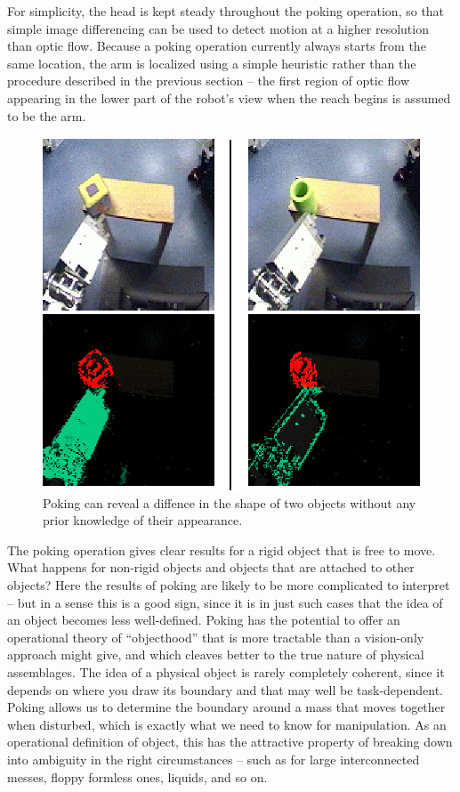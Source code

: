For simplicity, the head is kept steady throughout the poking
operation, so that simple image differencing can be used to detect
motion at a higher resolution than optic flow.  Because a poking
operation currently always starts from the same location, the arm
is localized using a simple heuristic rather than the procedure described
in the previous section -- the first region of optic flow appearing
in the lower part of the robot's view when the reach begins
is assumed to be the arm.

\ifverbose
\begin{figure}[tbh]
\begin{center}
\includegraphics[width=\columnwidth]{cube-and-cylinder.eps}
\caption{ 
\label{fig:cube-and-cylinder}
%
  Poking can reveal a diffence in the shape of two objects without
  any prior knowledge of their appearance.
%
}
\end{center}
\end{figure}
\fi

The poking operation gives clear results for a rigid object that is
free to move.  What happens for non-rigid objects and objects that are
attached to other objects?  Here the results of poking are likely to
be more complicated to interpret -- but in a sense this is a good
sign, since it is in just such cases that the idea of an object
becomes less well-defined.  Poking has the potential to offer an
operational theory of ``objecthood'' that is more tractable than a
vision-only approach might give, and which cleaves better to the true
nature of physical assemblages.  The idea of a physical object is
rarely completely coherent, since it depends on where you draw its
boundary and that may well be task-dependent.  Poking allows us to
determine the boundary around a mass that moves together when
disturbed, which is exactly what we need to know for manipulation.  As
an operational definition of object, this has the attractive property
of breaking down into ambiguity in the right circumstances -- such
as for large interconnected messes, floppy formless ones, liquids,
and so on.




\ifverbose

\fi


